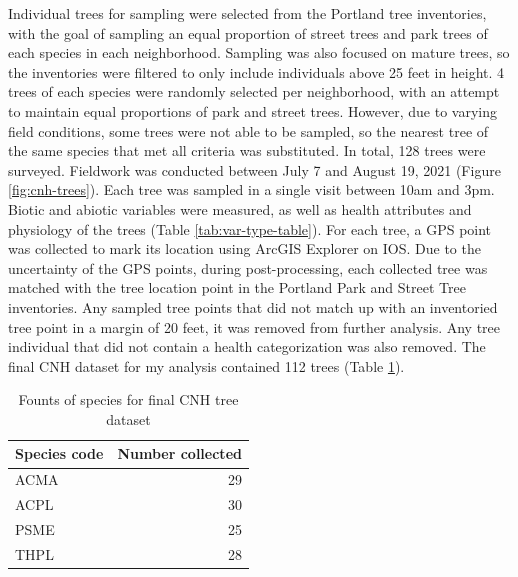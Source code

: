 \documentclass[12pt,twoside]{reedthesis}
\begin{document}
Individual trees for sampling were selected from the Portland tree
inventories, with the goal of sampling an equal proportion of street
trees and park trees of each species in each neighborhood. Sampling was
also focused on mature trees, so the inventories were filtered to only
include individuals above 25 feet in height. 4 trees of each species
were randomly selected per neighborhood, with an attempt to maintain
equal proportions of park and street trees. However, due to varying
field conditions, some trees were not able to be sampled, so the nearest
tree of the same species that met all criteria was substituted. In
total, 128 trees were surveyed. Fieldwork was conducted between July 7
and August 19, 2021 (Figure \ref{fig:cnh-trees}). Each tree was sampled
in a single visit between 10am and 3pm. Biotic and abiotic variables
were measured, as well as health attributes and physiology of the trees
(Table \ref{tab:var-type-table}). For each tree, a GPS point was
collected to mark its location using ArcGIS Explorer on IOS. Due to the
uncertainty of the GPS points, during post-processing, each collected
tree was matched with the tree location point in the Portland Park and
Street Tree inventories. Any sampled tree points that did not match up
with an inventoried tree point in a margin of 20 feet, it was removed
from further analysis. Any tree individual that did not contain a health
categorization was also removed. The final CNH dataset for my analysis
contained 112 trees (Table \ref{tab:cnh-tree-counts}).
\begin{table}

\caption[Final CNH Tree counts]{\label{tab:cnh-tree-counts}Founts of species for final CNH tree dataset}
\centering
\begin{tabular}[t]{lr}
\toprule
Species code & Number collected\\
\midrule
ACMA & 29\\
ACPL & 30\\
PSME & 25\\
THPL & 28\\
\bottomrule
\end{tabular}
\end{table}
\end{document}
